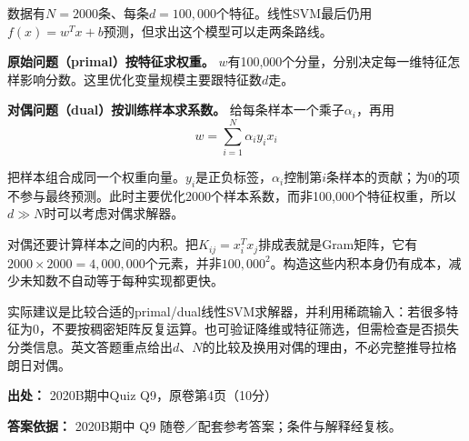 数据有\(N=2000\)条、每条\(d=100{,}000\)个特征。线性SVM最后仍用\(f(x)=w^Tx+b\)预测，但求出这个模型可以走两条路线。


\textbf{原始问题（primal）按特征求权重。} \(w\)有100,000个分量，分别决定每一维特征怎样影响分数。这里优化变量规模主要跟特征数\(d\)走。


\textbf{对偶问题（dual）按训练样本求系数。} 给每条样本一个乘子\(\alpha_i\)，再用
\[
w=\sum_{i=1}^{N}\alpha_i y_i x_i
\]


把样本组合成同一个权重向量。\(y_i\)是正负标签，\(\alpha_i\)控制第\(i\)条样本的贡献；为0的项不参与最终预测。此时主要优化2000个样本系数，而非100,000个特征权重，所以\(d\gg N\)时可以考虑对偶求解器。


对偶还要计算样本之间的内积。把\(K_{ij}=x_i^Tx_j\)排成表就是Gram矩阵，它有\(2000\times2000=4{,}000{,}000\)个元素，并非\(100{,}000^2\)。构造这些内积本身仍有成本，减少未知数不自动等于每种实现都更快。


实际建议是比较合适的primal/dual线性SVM求解器，并利用稀疏输入：若很多特征为0，不要按稠密矩阵反复运算。也可验证降维或特征筛选，但需检查是否损失分类信息。英文答题重点给出\(d\)、\(N\)的比较及换用对偶的理由，不必完整推导拉格朗日对偶。


\textbf{出处：} 2020B期中Quiz Q9，原卷第4页（10分）


\textbf{答案依据：} 2020B期中 Q9 随卷／配套参考答案；条件与解释经复核。

